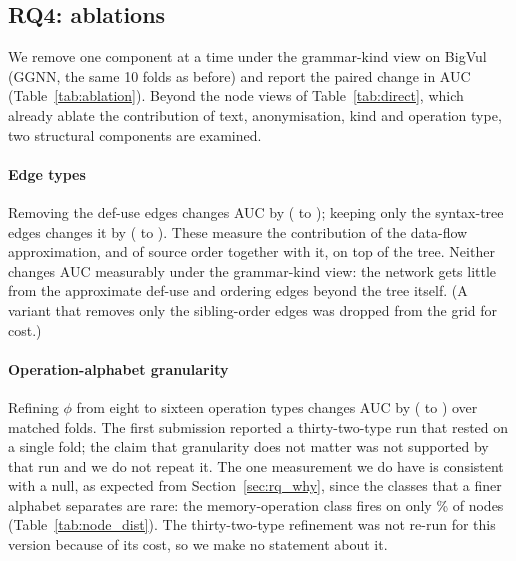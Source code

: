 \subsection{RQ4: ablations}
\label{sec:rq_ablation}

We remove one component at a time under the grammar-kind view on BigVul (GGNN,
the same 10 folds as before) and report the paired change in AUC
(Table~\ref{tab:ablation}). Beyond the node views of Table~\ref{tab:direct},
which already ablate the contribution of text, anonymisation, kind and
operation type, two structural components are examined.

\paragraph{Edge types} Removing the def-use edges changes AUC by
\numedgeNoDuDiff{} (\numedgeNoDuLo{} to \numedgeNoDuHi{}); keeping only the
syntax-tree edges changes it by \numedgeAstOnlyDiff{} (\numedgeAstOnlyLo{} to
\numedgeAstOnlyHi{}). These measure the contribution of the data-flow
approximation, and of source order together with it, on top of the tree.
Neither changes AUC measurably under the grammar-kind view: the network gets
little from the approximate def-use and ordering edges beyond the tree itself. (A
variant that removes only the sibling-order edges was dropped from the grid
for cost.)

\paragraph{Operation-alphabet granularity} Refining $\phi$ from eight to
sixteen operation types changes AUC by \numgranTOneSixDiff{}
(\numgranTOneSixLo{} to \numgranTOneSixHi{}) over \numgranTOneSixFolds{} matched
folds. The first submission reported a thirty-two-type run that rested on a
single fold; the claim that granularity does not matter was not supported by
that run and we do not repeat it. The one measurement we do have is consistent
with a null, as expected from Section~\ref{sec:rq_why}, since the classes that a
finer alphabet separates are rare: the memory-operation class fires on only
\numbvMemoryPct\% of nodes (Table~\ref{tab:node_dist}). The thirty-two-type
refinement was not re-run for this version because of its cost, so we make no
statement about it.


